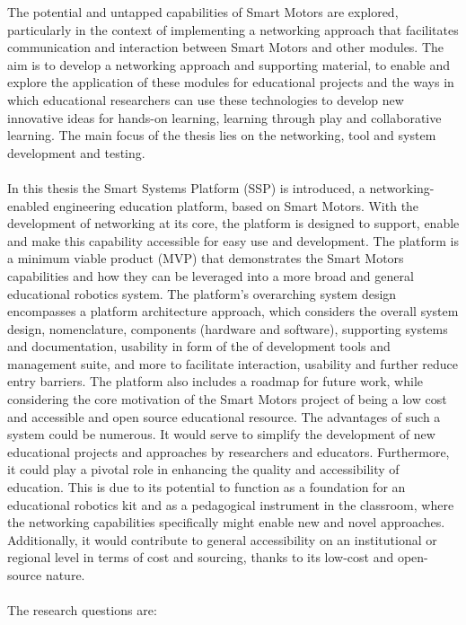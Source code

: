 The potential and untapped capabilities of Smart Motors are explored, particularly in the context of implementing a networking approach that facilitates communication and interaction between Smart Motors and other modules. The aim is to develop a networking approach and supporting material, to enable and explore the application of these modules for educational projects and the ways in which educational researchers can use these technologies to develop new innovative ideas for hands-on learning, learning through play and collaborative learning. The main focus of the thesis lies on the networking, tool and system development and testing.
\\\\
In this thesis the Smart Systems Platform (SSP) is introduced, a networking-enabled engineering education platform, based on Smart Motors.
With the development of networking at its core, the platform is designed to support, enable and make this capability accessible for easy use and development. 
The platform is a minimum viable product (MVP) that demonstrates the Smart Motors capabilities and how they can be leveraged into a more broad and general educational robotics system. The platform's overarching system design encompasses a platform architecture approach, which considers the overall system design, nomenclature, components (hardware and software), supporting systems and documentation, usability in form of the of development tools and management suite, and more to facilitate interaction, usability and further reduce entry barriers. The platform also includes a roadmap for future work, while considering the core motivation of the Smart Motors project of being a low cost and accessible and open source educational resource. The advantages of such a system could be numerous. It would serve to simplify the development of new educational projects and approaches by researchers and educators. Furthermore, it could play a pivotal role in enhancing the quality and accessibility of education. This is due to its potential to function as a foundation for an educational robotics kit and as a pedagogical instrument in the classroom, where the networking capabilities specifically might enable new and novel approaches. Additionally, it would contribute to general accessibility on an institutional or regional level in terms of cost and sourcing, thanks to its low-cost and open-source nature. 
\\\\
The research questions are:


